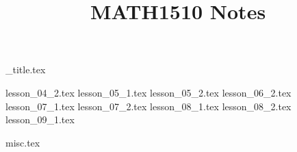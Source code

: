 \documentclass{article}
\title{MATH1510 Notes}
\author{}
\date{}
\begin{document}
{_title.tex}

\tableofcontents

{lesson_04_2.tex}
{lesson_05_1.tex}
{lesson_05_2.tex}
{lesson_06_2.tex}
{lesson_07_1.tex}
{lesson_07_2.tex}
{lesson_08_1.tex}
{lesson_08_2.tex}
{lesson_09_1.tex}

{misc.tex}
\end{document}
